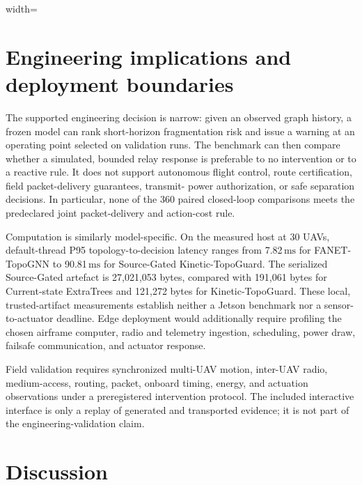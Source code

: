 \documentclass[final,5p,times,twocolumn]{elsarticle}
\newcommand{\SI}[2]{#1\,\ensuremath{\mathrm{#2}}}
\begin{document}
\begin{table}[t]
\centering
\caption{Measured additive host-loop timing at 30 UAVs (30 timed iterations after five warm-ups).}
\label{tab:latency}
\begin{adjustbox}{width=\linewidth}

\end{adjustbox}
\end{table}

\section{Engineering implications and deployment boundaries}

The supported engineering decision is narrow: given an observed graph history, a frozen
model can rank short-horizon fragmentation risk and issue a warning at an operating point
selected on validation runs. The benchmark can then compare whether a simulated, bounded
relay response is preferable to no intervention or to a reactive rule. It does not support
autonomous flight control, route certification, field packet-delivery guarantees, transmit-
power authorization, or safe separation decisions. In particular, none of the 360 paired
closed-loop comparisons meets the predeclared joint packet-delivery and action-cost rule.

Computation is similarly model-specific. On the measured host at 30 UAVs, default-thread
P95 topology-to-decision latency ranges from \SI{7.82}{ms} for FANET-TopoGNN to
\SI{90.81}{ms} for Source-Gated Kinetic-TopoGuard. The serialized Source-Gated artefact is
27,021,053 bytes, compared with 191,061 bytes for Current-state ExtraTrees and 121,272 bytes
for Kinetic-TopoGuard. These local, trusted-artifact measurements establish neither a
Jetson benchmark nor a sensor-to-actuator deadline. Edge deployment would additionally
require profiling the chosen airframe computer, radio and telemetry ingestion, scheduling,
power draw, failsafe communication, and actuator response.

Field validation requires synchronized multi-UAV motion, inter-UAV radio, medium-access,
routing, packet, onboard timing, energy, and actuation observations under a preregistered
intervention protocol. The included interactive interface is only a replay of generated
and transported evidence; it is not part of the engineering-validation claim.

\section{Discussion}
\end{document}
